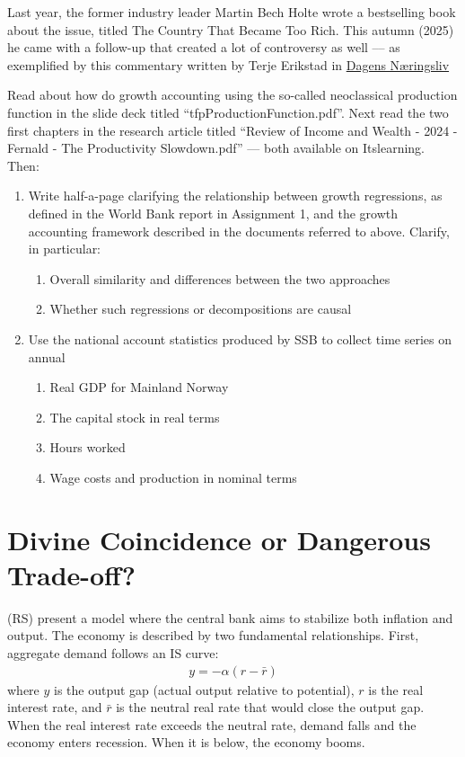 \documentclass[10pt]{article}
\begin{document}
Last year, the former industry leader Martin Bech Holte wrote a bestselling book about the
issue, titled The Country That Became Too Rich. This autumn (2025) he came with a follow-up
that created a lot of controversy as well --– as exemplified by this commentary written by
Terje Erikstad in \href{https://www.dn.no/kommentar/martin-bech-holte/produktivitet/produktivitetsvekst/martin-bech-holte-bor-trekke-boken-alternativt-statsbudsjett/2-1-1917021}{Dagens Næringsliv}

Read about how do growth accounting using the so-called neoclassical production function in
the slide deck titled “tfpProductionFunction.pdf”. Next read the two first chapters in the
research article titled “Review of Income and Wealth - 2024 - Fernald - The Productivity
Slowdown.pdf” --- both available on Itslearning. Then:

\begin{enumerate}[resume]
    \item Write half-a-page clarifying the relationship between growth regressions, as defined in
    the World Bank report in Assignment 1, and the growth accounting framework described
    in the documents referred to above. Clarify, in particular:
    \begin{enumerate}
        \item Overall similarity and differences between the two approaches
        \item Whether such regressions or decompositions are causal
    \end{enumerate}
    \newpage 
    \item Use the national account statistics produced by SSB to collect time series on annual
    \begin{enumerate}
        \item Real GDP for Mainland Norway
        \item The capital stock in real terms
        \item Hours worked
        \item Wage costs and production in nominal terms
    \end{enumerate}
\end{enumerate}
\newpage 
\section{Divine Coincidence or Dangerous Trade-off?}
\cite{roisland_sveen_2018_monetary_policy_inflation_targeting} (RS) present a model where the central bank aims to stabilize both inflation and output. The economy is described by two fundamental relationships. First, aggregate demand follows an IS curve:
\begin{gather*}
    y = -\alpha(r - \bar{r})
\end{gather*}
where $y $ is the output gap (actual output relative to potential), $r $ is the real interest rate, and $\bar{r} $ is the neutral real rate that would close the output gap. When the real interest rate exceeds the neutral rate, demand falls and the economy enters recession. When it is below, the economy booms. 
\end{document}
